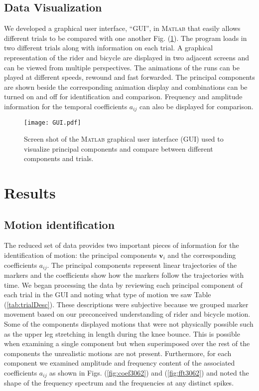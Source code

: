 \documentclass[smallextended]{svjour3}     %
\begin{document}
\subsection{Data Visualization}
\label{sec:dataVis}
We developed a graphical user interface, ``GUI'',  in \textsc{Matlab} that easily allows
different trials to be compared with one another Fig. (\ref{fig:GUI}). The
program loads in two different trials along with information on each trial. A
graphical representation of the rider and bicycle are displayed in two adjacent
screens and can be viewed from multiple perspectives. The animations of the
runs can be played at different speeds, rewound and fast forwarded. The
principal components are shown beside the corresponding animation display and
combinations can be turned on and off for identification and comparison.
Frequency and amplitude information for the temporal coefficients $a_{ij}$ can
also be displayed for comparison.
\begin{figure}[tbp]
    \begin{center}
        \texttt{[image: GUI.pdf]}
    \end{center}
    \caption{Screen shot of the \textsc{Matlab} graphical user interface (GUI)
    used to visualize principal components and compare between different
    components and trials.}
    \label{fig:GUI}
\end{figure}

\section{Results}
\label{sec:results}
\subsection{Motion identification}
\label{sec:motionId}
The reduced set of data provides two important pieces of information for the
identification of motion: the principal components $\mathbf{v}_i$ and the
corresponding coefficients $a_{ij}$. The principal components represent linear
trajectories of the markers and the coefficients show how the markers follow
the trajectories with time. We began processing the data by reviewing each
principal component of each trial in the GUI and noting what type of
motion we saw Table (\ref{tab:trialDesc}). These descriptions were subjective
because we grouped marker movement based on our preconceived understanding of
rider and bicycle motion. Some of the components displayed motions that were not
physically possible such as the upper leg stretching in length during the knee
bounce. This is possible when examining a single component but when
superimposed over the rest of the components the unrealistic motions are not
present. Furthermore, for each component we examined amplitude and frequency
content of the associated coefficients $a_{ij}$ as shown in Figs.
(\ref{fig:coef3062}) and (\ref{fig:fft3062}) and noted the shape of the
frequency spectrum and the
frequencies at any distinct spikes.
\end{document}
